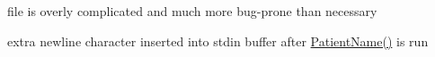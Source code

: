 
\begin{DoxyRefList}
\item[\label{bug__bug000001}%
\hypertarget{bug__bug000001}{}%
File \hyperlink{fileio_8hpp}{fileio.hpp} ]file is overly complicated and much more bug-\/prone than necessary  
\item[\label{bug__bug000002}%
\hypertarget{bug__bug000002}{}%
File \hyperlink{main_8cpp}{main.cpp} ]extra newline character inserted into stdin buffer after \hyperlink{namespaceavda_ae20728e7e8ae50bf2f74849e538841ea}{Patient\+Name()} is run 
\end{DoxyRefList}